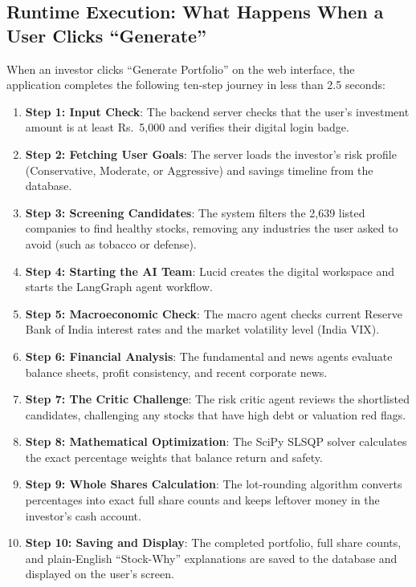 \subsection{Runtime Execution: What Happens When a User Clicks ``Generate''}
When an investor clicks ``Generate Portfolio'' on the web interface, the application completes the following ten-step journey in less than 2.5 seconds:
\begin{enumerate}
    \item \textbf{Step 1: Input Check}: The backend server checks that the user's investment amount is at least Rs.~5,000 and verifies their digital login badge.
    \item \textbf{Step 2: Fetching User Goals}: The server loads the investor's risk profile (Conservative, Moderate, or Aggressive) and savings timeline from the database.
    \item \textbf{Step 3: Screening Candidates}: The system filters the 2,639 listed companies to find healthy stocks, removing any industries the user asked to avoid (such as tobacco or defense).
    \item \textbf{Step 4: Starting the AI Team}: Lucid creates the digital workspace and starts the LangGraph agent workflow.
    \item \textbf{Step 5: Macroeconomic Check}: The macro agent checks current Reserve Bank of India interest rates and the market volatility level (India VIX).
    \item \textbf{Step 6: Financial Analysis}: The fundamental and news agents evaluate balance sheets, profit consistency, and recent corporate news.
    \item \textbf{Step 7: The Critic Challenge}: The risk critic agent reviews the shortlisted candidates, challenging any stocks that have high debt or valuation red flags.
    \item \textbf{Step 8: Mathematical Optimization}: The SciPy SLSQP solver calculates the exact percentage weights that balance return and safety.
    \item \textbf{Step 9: Whole Shares Calculation}: The lot-rounding algorithm converts percentages into exact full share counts and keeps leftover money in the investor's cash account.
    \item \textbf{Step 10: Saving and Display}: The completed portfolio, full share counts, and plain-English ``Stock-Why'' explanations are saved to the database and displayed on the user's screen.
\end{enumerate}

